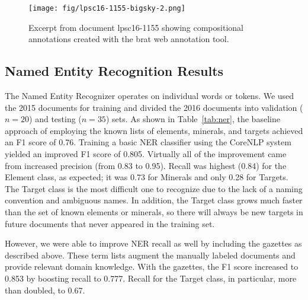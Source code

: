 \documentclass[letterpaper]{article} %
\begin{document}
\begin{figure}
\begin{center}
\texttt{[image: fig/lpsc16-1155-bigsky-2.png]}
\end{center}
\caption{Excerpt from document lpsc16-1155 showing compositional
annotations created with the brat web annotation tool.}
\label{fig:brat}
\end{figure}


\subsection{Named Entity Recognition Results}

The Named Entity Recognizer operates on individual words or tokens.  We
used the 2015 documents for training and divided the 2016 documents
into validation ($n=20$) and testing ($n=35$) sets.  
As shown in Table~\ref{tab:ner}, the baseline approach of employing
the known lists of elements, minerals, and targets achieved an
F1 score of 0.76.  Training a basic NER classifier using the CoreNLP
system yielded an improved F1 score of 0.805.  Virtually all of the
improvement came from increased precision (from 0.83 to 0.95).
Recall was highest (0.84) for the Element class, as expected; it was
0.73 for Minerals and only 0.28 for Targets.  The Target 
class is the most difficult one to recognize due to the lack of a
naming convention and ambiguous names.  In addition, the Target class
grows much faster than the set of known elements or minerals, so there
will always be new targets in future documents that never appeared in
the training set.

However, we were able to improve NER recall as well by including the
gazettes as described above.  These term lists augment the manually
labeled documents and provide relevant domain knowledge.  With the
gazettes, the F1 score increased to 0.853 by boosting recall to 0.777.
Recall for the Target class, in particular, more than doubled, to
0.67.
\end{document}
